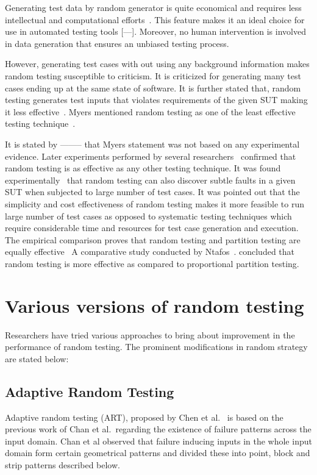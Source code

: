 Generating test data by random generator is quite economical and requires less intellectual and computational efforts~\cite{Ciupa2008a}. This feature makes it an ideal choice for use in automated testing tools [---]. Moreover, no human intervention is involved in data generation that ensures an unbiased testing process.

However, generating test cases with out using any background information makes random testing susceptible to criticism. It is criticized for generating many test cases ending up at the same state of software. It is further stated that, random testing generates test inputs that violates requirements of the given SUT making it less effective~\cite{sen2007effective, pacheco2009directed}. Myers mentioned random testing as one of the least effective testing technique~\cite{Myers1979}.

It is stated by -------- that Myers statement was not based on any experimental evidence. Later experiments performed by several researchers~\cite{hamlet1994, Ciupa2008, leitner2007efficient, Duran1981} confirmed that random testing is as effective as any other testing technique. It was found experimentally~\cite{Duran1981} that random testing can also discover subtle faults in a given SUT when subjected to large number of test cases. It was pointed out that the simplicity and cost effectiveness of random testing makes it more feasible to run large number of test cases as opposed to systematic testing techniques which require considerable time and resources for test case generation and execution. The empirical comparison proves that random testing and partition testing are equally effective~\cite{hamlet1990} A comparative study conducted by Ntafos~\cite{ntafos1998random}. concluded that random testing is more effective as compared to proportional partition testing.


\section{Various versions of random testing}
Researchers have tried various approaches to bring about improvement in the performance of random testing. The prominent modifications in random strategy are stated below:

\subsection{Adaptive Random Testing}
Adaptive random testing (ART), proposed by Chen et al.~\cite{Chen2008} is based on the previous work of Chan et al.~\cite{Chan1996}regarding the existence of failure patterns across the input domain. Chan et al observed that failure inducing inputs in the whole input domain form certain geometrical patterns and divided these into point, block and strip patterns described below.

